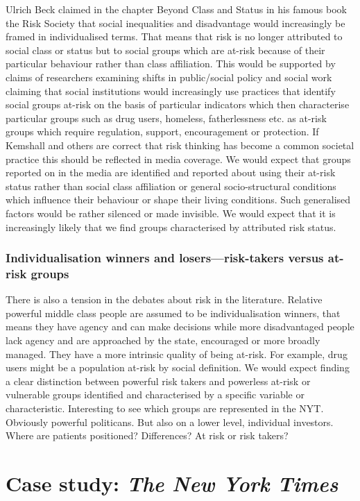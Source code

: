 Ulrich Beck claimed in the chapter Beyond Class and Status in his famous book the Risk Society that social inequalities and disadvantage would increasingly be framed in individualised terms. That means that risk is no longer attributed to social class or status but to social groups which are at-risk because of their particular behaviour rather than class affiliation. 
This would be supported by claims of researchers examining shifts in public\slash social policy and social work claiming that social institutions would increasingly use practices that identify social groups at-risk on the basis of particular indicators which then characterise particular groups such as drug users, homeless, fatherlessness etc. as at-risk groups which require regulation, support, encouragement or protection. If Kemshall and others are correct that risk thinking has become a common societal practice this should be reflected in media coverage.
We would expect that groups reported on in the media are identified and reported about using their at-risk status rather than social class affiliation or general socio-structural conditions which influence their behaviour or shape their living conditions. Such generalised factors would be rather silenced or made invisible. We would expect that it is increasingly likely that we find groups characterised by attributed risk status.

\subsubsection*{Individualisation winners and losers---risk-takers versus at-risk groups}
There is also a tension in the debates about risk in the literature. Relative powerful middle class people are assumed to be individualisation winners, that means they have agency and can make decisions while more disadvantaged people lack agency and are approached by the state, encouraged or more broadly managed. They have a more intrinsic quality of being at-risk. For example, drug users might be a population at-risk by social definition. We would expect finding a clear distinction between powerful risk takers and powerless at-risk or vulnerable groups identified and characterised by a specific variable or characteristic.
Interesting to see which groups are represented in the NYT. Obviously powerful politicans. But also on a lower level, individual investors. Where are patients positioned? Differences? At risk or risk takers?




\section{Case study: \emph{The New York Times}}

